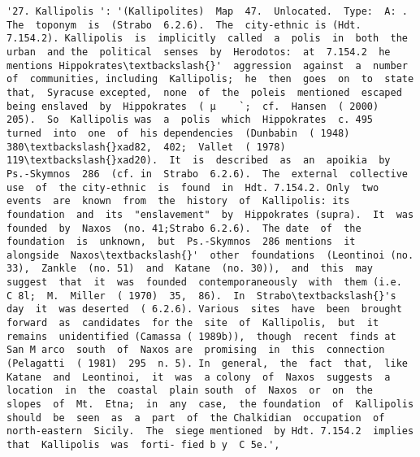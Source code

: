 \documentclass[11pt]{article}
\begin{document}
\begin{Verbatim}[commandchars=\\\{\}]
         '27. Kallipolis ': '(Kallipolites)  Map  47.  Unlocated.  Type:  A: . The  toponym  is  (Strabo  6.2.6).  The  city-ethnic is (Hdt. 7.154.2). Kallipolis  is  implicitly  called  a  polis  in  both  the  urban  and the  political  senses  by  Herodotos:  at  7.154.2  he  mentions Hippokrates\textbackslash{}'  aggression  against  a  number  of  communities, including  Kallipolis;  he  then  goes  on  to  state  that,  Syracuse excepted,  none  of  the  poleis  mentioned  escaped  being enslaved  by  Hippokrates  ( µ    `;  cf.  Hansen  ( 2000)  205).  So  Kallipolis was  a  polis  which  Hippokrates  c. 495  turned  into  one  of  his dependencies  (Dunbabin  ( 1948)  380\textbackslash{}xad82,  402;  Vallet  ( 1978) 119\textbackslash{}xad20).  It  is  described  as  an  apoikia  by  Ps.-Skymnos  286  (cf. in  Strabo  6.2.6).  The  external  collective use  of  the city-ethnic  is  found  in  Hdt. 7.154.2. Only  two  events  are  known  from  the  history  of  Kallipolis: its  foundation  and  its  "enslavement"  by  Hippokrates (supra).  It  was  founded  by  Naxos  (no. 41;Strabo 6.2.6).  The date  of  the  foundation  is  unknown,  but  Ps.-Skymnos  286 mentions  it  alongside  Naxos\textbackslash{}'  other  foundations  (Leontinoi (no. 33),  Zankle  (no. 51)  and  Katane  (no. 30)),  and  this  may suggest  that  it  was  founded  contemporaneously  with  them (i.e.  C 8l;  M.  Miller  ( 1970)  35,  86).  In  Strabo\textbackslash{}'s  day  it  was deserted  ( 6.2.6). Various  sites  have  been  brought  forward  as  candidates  for the  site  of  Kallipolis,  but  it  remains  unidentified (Camassa ( 1989b)),  though  recent  finds at San M arco  south  of  Naxos are  promising  in  this  connection  (Pelagatti  ( 1981)  295  n. 5). In  general,  the  fact  that,  like  Katane  and  Leontinoi,  it  was  a colony  of  Naxos  suggests  a  location  in  the  coastal  plain south  of  Naxos  or  on  the  slopes  of  Mt.  Etna;  in  any  case,  the foundation  of  Kallipolis  should  be  seen  as  a  part  of  the Chalkidian  occupation  of  north-eastern  Sicily.  The  siege mentioned  by Hdt. 7.154.2  implies  that  Kallipolis  was  forti- fied b y  C 5e.',

\end{Verbatim}
\end{document}
